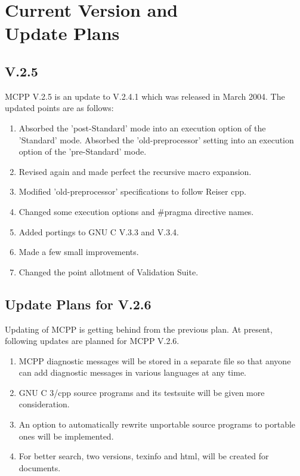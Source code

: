 \documentclass[twocolumn]{article}
\begin{document}
\section{Current Version and \\
Update Plans}

\subsection{V.2.5}

MCPP V.2.5 is an update to V.2.4.1 which was released in March 2004.
The updated points are as follows:

\begin{enumerate}
\item Absorbed the 'post-Standard' mode into an execution option of the 'Standard' mode.  Absorbed the 'old-preprocessor' setting into an execution option of the 'pre-Standard' mode.
\item Revised again and made perfect the recursive macro expansion.
\item Modified 'old-preprocessor' specifications to follow Reiser cpp.
\item Changed some execution options and \#pragma directive names.
\item Added portings to GNU C V.3.3 and V.3.4.
\item Made a few small improvements.
\item Changed the point allotment of Validation Suite.
\end{enumerate}

\subsection{Update Plans for V.2.6}

Updating of MCPP is getting behind from the previous plan.  At present, following updates are planned for MCPP V.2.6.

\begin{enumerate}
\item MCPP diagnostic messages will be stored in a separate file so that anyone can add diagnostic messages in various languages at any time.
\item GNU C 3/cpp source programs and its testsuite will be given more consideration.
\item An option to automatically rewrite unportable source programs to portable ones will be implemented.
\item For better search, two versions, texinfo and html, will be created for documents.
\end{enumerate}
\end{document}
